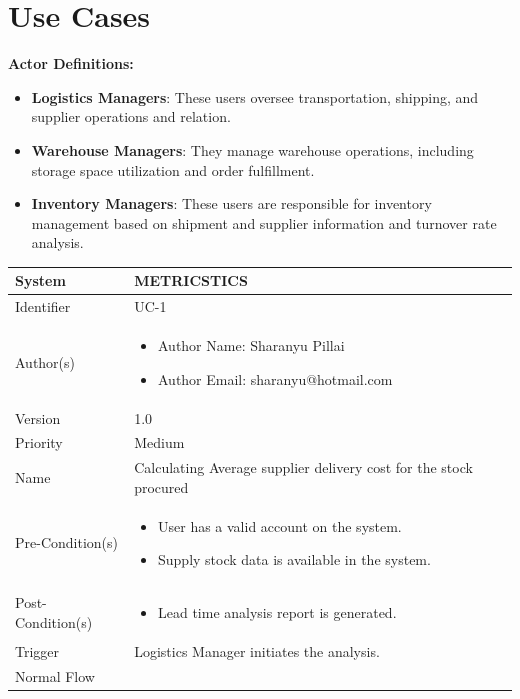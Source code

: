 \section{Use Cases}
\textbf{Actor Definitions:}
\begin{itemize}
	\item \textbf{Logistics Managers}: These users oversee transportation, shipping, and supplier operations and relation.
	\item \textbf{Warehouse Managers}: They manage warehouse operations, including storage space utilization and order fulfillment.
	\item \textbf{Inventory Managers}: These users are responsible for inventory management based on shipment and supplier information and turnover rate analysis.
\end{itemize}
\begin{center}
	\begin{tabularx}{\textwidth}{|l|X|}
		\hline
		System & METRICSTICS \\
		\hline
		Identifier & UC-1 \\
		\hline
		Author(s) & \begin{itemize}[left=0pt]
			\item Author Name: Sharanyu Pillai
			\item Author Email: sharanyu@hotmail.com
		\end{itemize} \\
		\hline
		Version & 1.0 \\
		\hline
		Priority & Medium \\
		\hline
		Name & Calculating Average supplier delivery cost for the stock procured \\
		\hline
		Pre-Condition(s) &  \begin{itemize}[left=0pt]
			\item User has a valid account on the system.
			\item Supply stock data is available in the system.
		\end{itemize} \\
		\hline
		Post-Condition(s) & \begin{itemize}[left=0pt]
			\item Lead time analysis report is generated.
		\end{itemize} \\
		\hline
		Trigger & Logistics Manager initiates the analysis. \\
		\hline
		Normal Flow & \begin{enumerate}[left=0pt]

\end{enumerate}
\end{tabularx}
\end{center}
